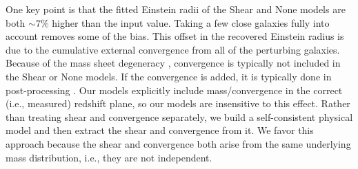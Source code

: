 One key point is that the fitted Einstein radii of the Shear and None models are both $\sim 7\%$ higher than the input value. Taking a few close galaxies fully into account removes some of the bias. This offset in the recovered Einstein radius is due to the cumulative external convergence from all of the perturbing galaxies. Because of the mass sheet degeneracy \citep{Falco85}, convergence is typically not included in the Shear or None models. If the convergence is added, it is typically done in post-processing \citep{Collett13, Suyu10}. Our models explicitly include mass/convergence in the correct (i.e., measured) redshift plane, so our models are insensitive to this effect. Rather than treating shear and convergence separately, we build a self-consistent physical model and then extract the shear and convergence from it. We favor this approach because the shear and convergence both arise from the same underlying mass distribution, i.e., they are not independent.
  